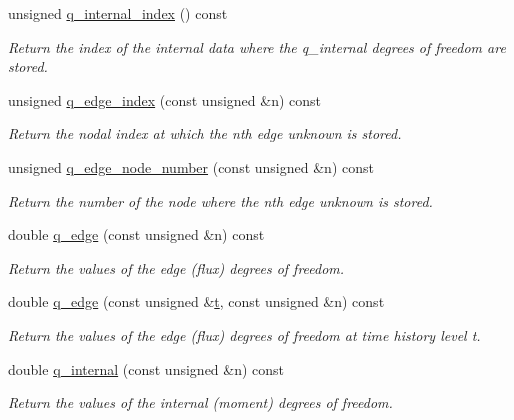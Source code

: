 \begin{DoxyCompactItemize}
unsigned \hyperlink{classoomph_1_1TPoroelasticityElement_a48a1a06d3f87bbd923e8222cf8c19e66}{q\+\_\+internal\+\_\+index} () const
\begin{DoxyCompactList}\small\item\em Return the index of the internal data where the q\+\_\+internal degrees of freedom are stored. \end{DoxyCompactList}\item 
unsigned \hyperlink{classoomph_1_1TPoroelasticityElement_a3486524ccf5ec2c3213a700a8d9beddd}{q\+\_\+edge\+\_\+index} (const unsigned \&n) const
\begin{DoxyCompactList}\small\item\em Return the nodal index at which the nth edge unknown is stored. \end{DoxyCompactList}\item 
unsigned \hyperlink{classoomph_1_1TPoroelasticityElement_acfccb491755f774ef5fa4803fad53abe}{q\+\_\+edge\+\_\+node\+\_\+number} (const unsigned \&n) const
\begin{DoxyCompactList}\small\item\em Return the number of the node where the nth edge unknown is stored. \end{DoxyCompactList}\item 
double \hyperlink{classoomph_1_1TPoroelasticityElement_a009eca6ca9d19912f3523605190cccb5}{q\+\_\+edge} (const unsigned \&n) const
\begin{DoxyCompactList}\small\item\em Return the values of the edge (flux) degrees of freedom. \end{DoxyCompactList}\item 
double \hyperlink{classoomph_1_1TPoroelasticityElement_aafc2bfff42ab8d5e6b6c4759e2929f81}{q\+\_\+edge} (const unsigned \&\hyperlink{cfortran_8h_af6f0bd3dc13317f895c91323c25c2b8f}{t}, const unsigned \&n) const
\begin{DoxyCompactList}\small\item\em Return the values of the edge (flux) degrees of freedom at time history level t. \end{DoxyCompactList}\item 
double \hyperlink{classoomph_1_1TPoroelasticityElement_aea5341bc3d2b89c13a6907b1f10feffc}{q\+\_\+internal} (const unsigned \&n) const
\begin{DoxyCompactList}\small\item\em Return the values of the internal (moment) degrees of freedom. \end{DoxyCompactList}\item 

\end{DoxyCompactItemize}
